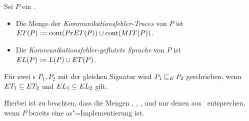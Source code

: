 \begin{Def}
  \label{KommFehlerSemDef}
  Sei $P$ ein \MEIO{}.
  \begin{itemize}
    \item Die Menge der \emph{Kommunikationsfehler-Traces} von $P$ ist $ET (P)
      := \mathrm{cont} (PrET (P)) \cup\mathrm{cont} (MIT (P))$.
    \item Die \emph{Kommunikationsfehler-geflutete Sprache} von $P$ ist $EL
      (P) := L(P) \cup ET (P)$.
  \end{itemize}
  Für zwei \MEIO{}s $P_1,P_2$ mit der gleichen Signatur wird $P_1 \sqsubseteq  _E P_2$
  geschrieben, wenn $ET _1\subseteq ET _2$ und $EL _1 \subseteq EL _2$
  gilt.
\end{Def}

Hierbei ist zu beachten, dass die Mengen \StET{}, \PrET{}, \MIT{}, \ET{} und
\EL{} nur denen aus~\cite{Schinko2016BA} entsprechen, wenn $P$ bereits eine
as"=Implementierung ist.

